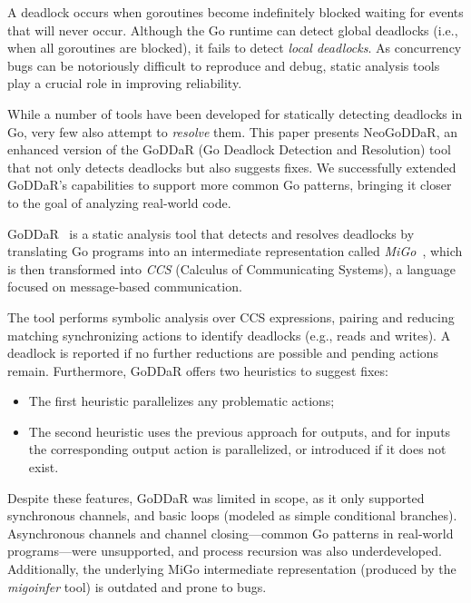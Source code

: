 \documentclass[runningheads]{llncs}
\begin{document}
A deadlock occurs when goroutines become indefinitely blocked waiting for events that will never occur.
Although the Go runtime can detect global deadlocks (i.e., when all goroutines are blocked), it fails to detect \emph{local deadlocks}.
As concurrency bugs can be notoriously difficult to reproduce and debug, static analysis tools play a crucial role in improving reliability.

While a number of tools have been developed for statically detecting deadlocks in Go, very few also attempt to \emph{resolve} them.
This paper presents NeoGoDDaR, an enhanced version of the GoDDaR (Go Deadlock Detection and Resolution) tool that not only detects deadlocks but also suggests fixes.
We successfully extended GoDDaR’s capabilities to support more common Go patterns, bringing it closer to the goal of analyzing real-world code.

GoDDaR~\cite{GoDDaR} is a static analysis tool that detects and resolves deadlocks by translating Go programs into an intermediate representation called \textit{MiGo}~\cite{MiGo}, which is then transformed into \textit{CCS} (Calculus of Communicating Systems), a language focused on message-based communication.

The tool performs symbolic analysis over CCS expressions, pairing and reducing matching synchronizing actions to identify deadlocks (e.g., reads and writes).
A deadlock is reported if no further reductions are possible and pending actions remain.
Furthermore, GoDDaR offers two heuristics to suggest fixes:
\begin{itemize}
     \item The first heuristic parallelizes any problematic actions;
     \item The second heuristic uses the previous approach for outputs, and for inputs the corresponding output action is parallelized, or introduced if it does not exist.
\end{itemize}

Despite these features, GoDDaR was limited in scope, as it only supported synchronous channels, and basic loops (modeled as simple conditional branches).
Asynchronous channels and channel closing---common Go patterns in real-world programs---were unsupported, and process recursion was also underdeveloped.
Additionally, the underlying MiGo intermediate representation (produced by the \textit{migoinfer} tool) is outdated and prone to bugs.
\end{document}
